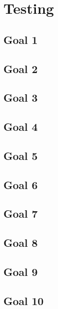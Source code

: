 \chapter{Testing}

\section{Goal 1}
\section{Goal 2}

\section{Goal 3}

\section{Goal 4}

\section{Goal 5}

\section{Goal 6}

\section{Goal 7}

\section{Goal 8}

\section{Goal 9}

\section{Goal 10}
